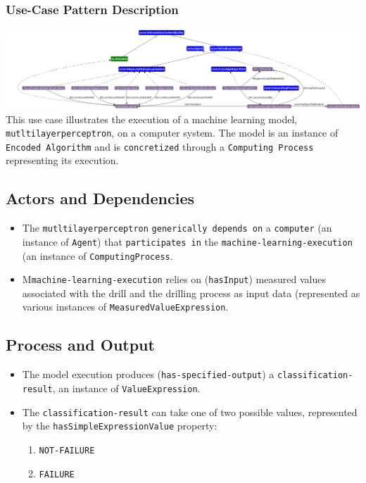 \subsubsection*{Use-Case Pattern Description}

\includegraphics[scale=0.23]{scenarios/algorithm-execution/images/algorithm-execution-usecase1.png}
This use case illustrates the execution of a machine learning model, \texttt{mutltilayerperceptron}, on a computer system. The model is an instance of \texttt{Encoded Algorithm} and is \texttt{concretized} through a \texttt{Computing Process} representing its execution.

\subsection*{Actors and Dependencies}  
\begin{itemize}
    \item The \texttt{mutltilayerperceptron}  \texttt{generically depends on} a \texttt{computer} (an instance of \texttt{Agent}) that \texttt{participates in} the \texttt{machine-learning-execution} (an instance of \texttt{ComputingProcess}.
    \item M\texttt{machine-learning-execution} relies on (\texttt{hasInput}) measured values associated with the drill and the drilling process as input data (represented as various instances of \texttt{MeasuredValueExpression}.
\end{itemize}

\subsection*{Process and Output}  
\begin{itemize}
    \item The model execution produces (\texttt{has-specified-output}) a \texttt{classification-result}, an instance of \texttt{ValueExpression}.
    \item The \texttt{classification-result} can take one of two possible values, represented by the \texttt{hasSimpleExpressionValue} property:
    \begin{enumerate}
        \item \texttt{NOT-FAILURE}
        \item \texttt{FAILURE}
    \end{enumerate}
\end{itemize}

